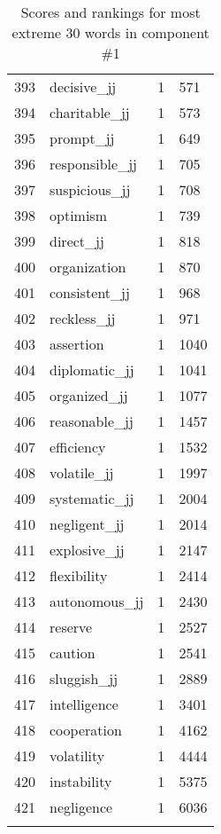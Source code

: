 \begin{longtable}[!htbp]{| rlr@{.}l |}
    393 & decisive\_jj & 1 & 571 \\
    394 & charitable\_jj & 1 & 573 \\
    395 & prompt\_jj & 1 & 649 \\
    396 & responsible\_jj & 1 & 705 \\
    397 & suspicious\_jj & 1 & 708 \\
    398 & optimism & 1 & 739 \\
    399 & direct\_jj & 1 & 818 \\
    400 & organization & 1 & 870 \\
    401 & consistent\_jj & 1 & 968 \\
    402 & reckless\_jj & 1 & 971 \\
    403 & assertion & 1 & 1040 \\
    404 & diplomatic\_jj & 1 & 1041 \\
    405 & organized\_jj & 1 & 1077 \\
    406 & reasonable\_jj & 1 & 1457 \\
    407 & efficiency & 1 & 1532 \\
    408 & volatile\_jj & 1 & 1997 \\
    409 & systematic\_jj & 1 & 2004 \\
    410 & negligent\_jj & 1 & 2014 \\
    411 & explosive\_jj & 1 & 2147 \\
    412 & flexibility & 1 & 2414 \\
    413 & autonomous\_jj & 1 & 2430 \\
    414 & reserve & 1 & 2527 \\
    415 & caution & 1 & 2541 \\
    416 & sluggish\_jj & 1 & 2889 \\
    417 & intelligence & 1 & 3401 \\
    418 & cooperation & 1 & 4162 \\
    419 & volatility & 1 & 4444 \\
    420 & instability & 1 & 5375 \\
    421 & negligence & 1 & 6036 \\
    \hline
    \caption{Scores and rankings for most extreme 30 words in component \#1} \\
\end{longtable}
